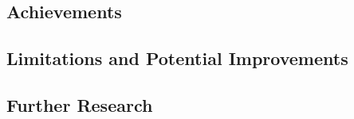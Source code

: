 %  
%

\subsection{ Achievements }

\subsection{ Limitations and Potential Improvements }

\subsection{ Further Research }
